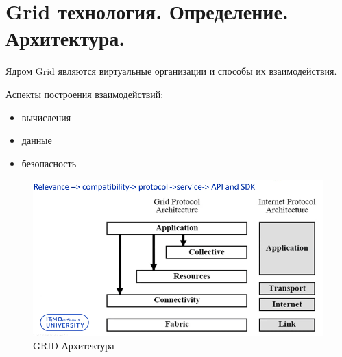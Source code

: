 \section{Grid технология. Определение. Архитектура.}


Ядром Grid являются виртуальные организации и способы их взаимодействия.

Аспекты построения взаимодействий:
\begin{itemize}
    \item вычисления
    \item данные
    \item безопасность
\end{itemize}

\begin{figure}[h]
	\centering
	\begin{minipage}[b]{0.8\textwidth}
		\includegraphics[width=\textwidth]{images/grid.png}
		\caption{GRID Архитектура}
	\end{minipage}
\end{figure}

